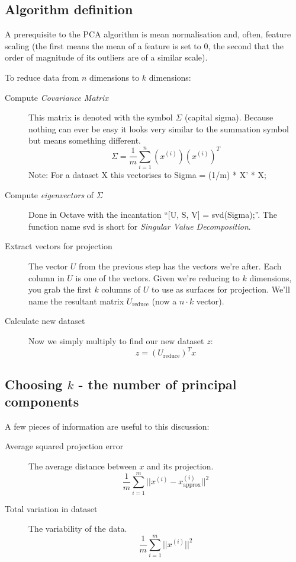 \subsection{Algorithm definition}

A prerequisite to the PCA algorithm is mean normalisation and, often, feature scaling (the first means the mean of a feature is set to 0, the second that the order of magnitude of its outliers are of a similar scale).

To reduce data from $n$ dimensions to $k$ dimensions:

\begin{description}
\item[Compute \emph{Covariance Matrix}] This matrix is denoted with the symbol $\Sigma$ (capital sigma). Because nothing can ever be easy it looks very similar to the summation symbol but means something different.
\[
\Sigma = \frac{1}{m}\sum^n_{i = 1}(x^{(i)})(x^{(i)})^T
\]
Note: For a dataset X this vectorises to Sigma = (1/m) * X' * X;
\item[Compute \emph{eigenvectors} of $\Sigma$] Done in Octave with the incantation ``[U, S, V] = svd(Sigma);''. The function name svd is short for \emph{Singular Value Decomposition}.

\item[Extract vectors for projection] The vector $U$ from the previous step has the vectors we're after. Each column in $U$ is one of the vectors. Given we're reducing to $k$ dimensions, you grab the first $k$ columns of $U$ to use as surfaces for projection. We'll name the resultant matrix $U_{\textrm{reduce}}$ (now a $n \cdot k$ vector).

\item[Calculate new dataset] Now we simply multiply to find our new dataset $z$:
\[
z = (U_{\textrm{reduce}})^Tx
\]

\end{description}

\subsection{Choosing $k$ - the number of principal components}

A few pieces of information are useful to this discussion:

\begin{description}
\item[Average squared projection error] The average distance between $x$ and its projection.
\[
\frac{1}{m}\sum^m_{i = 1}||x^{(i)} - x^{(i)}_{\textrm{approx}}||^2
\]
\item[Total variation in dataset] The variability of the data.
\[
\frac{1}{m}\sum^m_{i = 1}||x^{(i)}||^2
\]
\end{description}

